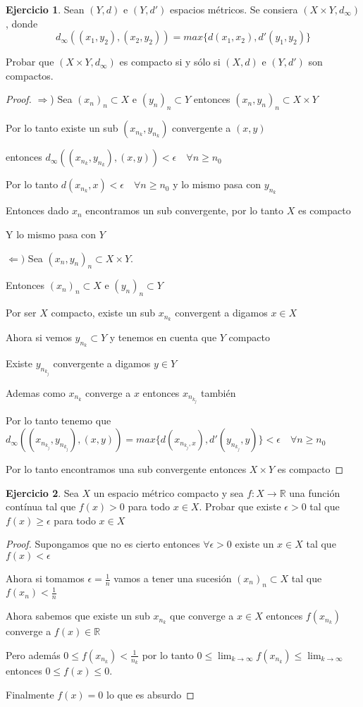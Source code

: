 \documentclass[11pt]{report}
\newcommand{\R}{\mathbb{R}}
\newcommand{\Ra}{\Rightarrow}
\newcommand{\ra}{\rightarrow}
\theoremstyle{definition}
\newtheorem{ej}{Ejercicio}
\begin{document}
	\begin{ej}
		Sean $(Y,d)$ e $(Y,d')$ espacios métricos. Se consiera $(X\times Y,d_{\infty})$, donde
		$$ d_{\infty}((x_1,y_2),(x_2,y_2))= max\{d(x_1,x_2),d'(y_1,y_2)\}$$

		Probar que $(X\times Y,d_{\infty})$ es compacto si y sólo si $(X,d)$ e $(Y,d')$ son compactos.
		\begin{proof}
			$\Ra $) Sea $(x_n)_n \subset X$  e $(y_n)_n \subset Y$ entonces $(x_n,y_n)_n \subset X \times Y$

			Por lo tanto existe un sub $(x_{n_k},y_{n_k})$ convergente a $(x,y)$

			entonces $d_{\infty }((x_{n_k},y_{n_k}),(x,y)) < \epsilon \quad \forall n \geq n_0$

			Por lo tanto $d(x_{n_k},x) < \epsilon \quad \forall n \geq n_0$ y lo mismo pasa con $y_{n_k}$

			Entonces dado $x_n$ encontramos un sub convergente, por lo tanto $X$ es compacto

			Y lo mismo pasa con $Y$

			$\Leftarrow ) $ Sea $(x_n,y_n)_n \subset X \times Y$. 

			Entonces $(x_n)_n \subset X$ e $(y_n)_n \subset Y$

			Por ser $X$ compacto, existe un sub $x_{n_k}$ convergent a digamos $x \in X$ 

			Ahora si vemos $y_{n_k} \subset Y$ y tenemos en cuenta que $Y$ compacto

			Existe $y_{n_{k_j}}$ convergente a digamos $y \in Y$

			Ademas como $x_{n_k}$ converge a $x$ entonces $x_{n_{k_j}}$ también

			Por lo tanto tenemo que $d_{\infty}((x_{n_{k_j}},y_{n_{k_j}}),(x,y)) = max\{d(x_{n_{k_j},x}),d'(y_{n_{k_j}},y)\} <  \epsilon \quad \forall n \geq n_0$

			Por lo tanto encontramos una sub convergente entonces $X \times Y$ es compacto
		\end{proof}
	\end{ej}
	
	\begin{ej}
		Sea $X$ un espacio métrico compacto y sea $f : X \ra \R$ una función contínua tal que $f(x) > 0$ para todo $x \in X$. Probar que existe $\epsilon >0$ tal que $f(x) \geq \epsilon$ para todo $x \in X$
		\begin{proof}
			Supongamos que no es cierto entonces $\forall \epsilon > 0 $ existe un $x \in X$ tal que $f(x) < \epsilon$

			Ahora si tomamos $\epsilon = \frac{1}{n}$ vamos a tener una sucesión $(x_n)_n \subset X$ tal que $f(x_n) < \frac{1}{n}$

			Ahora sabemos que existe un sub $x_{n_k}$ que converge a $x\in X$ entonces $f(x_{n_k})$ converge a $f(x) \in \R$

			Pero además $0\leq f(x_{n_k}) < \frac{1}{n_k}$ por lo tanto $0 \leq \lim_{k \ra \infty} f(x_{n_k}) \leq \lim_{k\ra \infty}$ entonces $0 \leq f(x) \leq 0$.

			Finalmente $f(x) = 0$ lo que es absurdo
		\end{proof}
		
	\end{ej}
\end{document}
